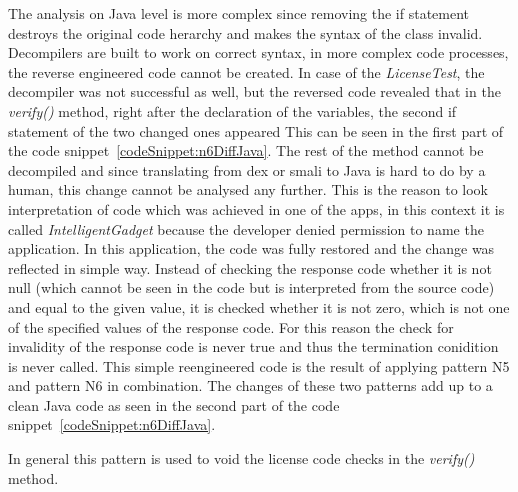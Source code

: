 The analysis on Java level is more complex since removing the if statement destroys the original code herarchy and makes the syntax of the class invalid.
Decompilers are built to work on correct syntax, in more complex code processes, the reverse engineered code cannot be created.
In case of the \textit{LicenseTest}, the decompiler was not successful as well, but the reversed code revealed that in the \textit{verify()} method, right after the declaration of the variables, the second if statement of the two changed ones appeared
This can be seen in the first part of the code snippet~\ref{codeSnippet:n6DiffJava}.
The rest of the method cannot be decompiled and since translating from dex or smali to Java is hard to do by a human, this change cannot be analysed any further.
This is the reason to look interpretation of code which was achieved in one of the apps, in this context it is called \textit{IntelligentGadget} because the developer denied permission to name the application.
In this application, the code was fully restored and the change was reflected in simple way.
Instead of checking the response code whether it is not null (which cannot be seen in the code but is interpreted from the source code) and equal to the given value, it is checked whether it is not zero, which is not one of the specified values of the response code.
For this reason the check for invalidity of the response code is never true and thus the termination conidition is never called.
This simple reengineered code is the result of applying pattern N5 and pattern N6 in combination.
The changes of these two patterns add up to a clean Java code as seen in the second part of the code snippet~\ref{codeSnippet:n6DiffJava}.
\newline


In general this pattern is used to void the license code checks in the \textit{verify()} method.
